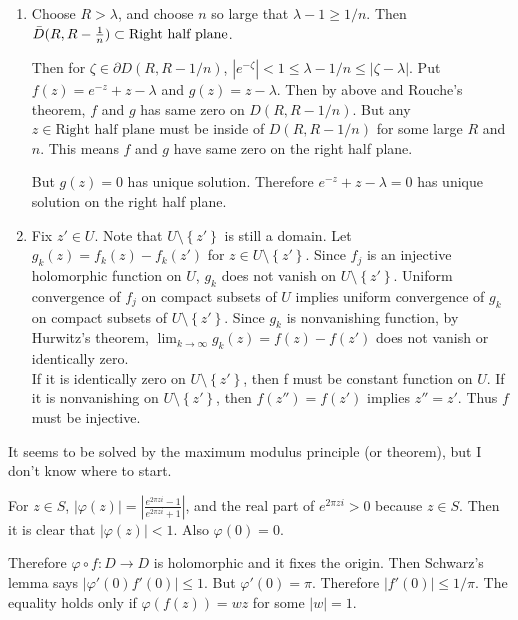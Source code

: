 \begin{problem}[5.3] \hfill
	\begin{enumerate}[label = (\alph*)]
		\item Choose $R > \lambda$, and choose $n$ so large that $\lambda -1 \geq 1/n$. Then $\bar{D}(R, R-{1 \over n}) \subset \text{Right half plane}$.

			Then for $\zeta \in \partial D(R, R-1/n)$, $|e^{-\zeta}| < 1 \leq \lambda - 1/n \leq |\zeta-\lambda|$.
			Put $f(z) = e^{-z} + z - \lambda$ and $g(z) = z-\lambda$. Then by above and Rouche's theorem, $f$ and $g$ has same zero on $D(R, R-1/n)$.
			But any $z \in \text{Right half plane}$ must be inside of $D(R, R-1/n)$ for some large $R$ and $n$. This means $f$ and $g$ have same zero on the right half plane.

			But $g(z) = 0$ has unique solution. Therefore $e^{-z}+z -\lambda = 0$ has unique solution on the right half plane.

		\item	Fix $z' \in U$. Note that $U\setminus \left\{ z' \right\}$ is still a domain. Let $g_k (z) = f_k (z) - f_k(z')$ for $z \in U \setminus \left\{ z' \right\}$.
			Since $f_j$ is an injective holomorphic function on $U$, $g_k$ does not vanish on $U \setminus \left\{ z' \right\}$.
			Uniform convergence of $f_j$ on compact subsets of $U$ implies uniform convergence of $g_k$ on compact subsets of $U\setminus \left\{ z' \right\}$.
			Since $g_k$ is nonvanishing function, by Hurwitz's theorem, $\lim_{k\rightarrow \infty} g_k(z) = f(z) - f(z')$ does not vanish or identically zero. \\

			If it is identically zero on $U \setminus \left\{ z' \right\}$, then f must be constant function on $U$.
			If it is nonvanishing on $U \setminus \left\{ z' \right\}$, then $f(z'') = f(z')$ implies $z'' = z'$. Thus $f$ must be injective.
	\end{enumerate}
	
\end{problem}

\begin{problem}[5.4] \hfill

	It seems to be solved by the maximum modulus principle (or theorem), but I don't know where to start.
	
\end{problem}

\begin{problem}[5.5] \hfill

	For $z \in S$, $|\varphi(z)| = \left | \frac{e^{2\pi z i} -1 }{e^{2\pi z i} + 1}\right |$, and the real part of $e^{2\pi z i} > 0$ because $z \in S$. Then it is clear that $|\varphi(z) | < 1$. Also $\varphi(0) = 0$.

	Therefore $\varphi \circ f : D \rightarrow D$ is holomorphic and it fixes the origin. Then Schwarz's lemma says $|\varphi'(0)f'(0) | \leq 1$.  But $\varphi'(0) = \pi$. Therefore $|f'(0)| \leq 1/\pi$. The equality holds only if $\varphi(f(z)) = wz$ for some $|w| = 1$.
	
\end{problem}
